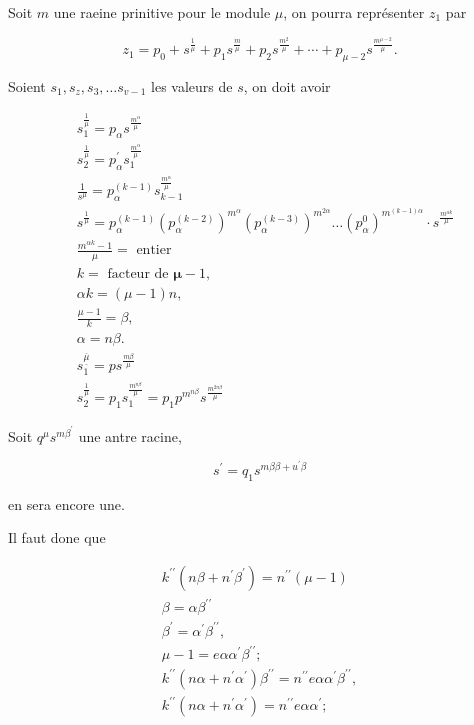 \documentclass{article}
\begin{document}
Soit \(m\) une raeine prinitive pour le module \(\mu\), on pourra représenter \(z_{1}\) par

\[
z_{1}=p_{0}+s^{\frac{1}{\mu}}+p_{1} s^{\frac{m}{\mu}}+p_{2} s^{\frac{m^{2}}{\mu}}+\cdots+p_{\mu-2} s^{\frac{m^{\mu-2}}{\mu}} .
\]

Soient \(s_{1}, s_{z}, s_{3}, \ldots s_{v-1}\) les valeurs de \(s\), on doit avoir

\[
\begin{aligned}
& s_{1}^{\frac{1}{\mu}}=p_{\alpha} s^{\frac{m^{\alpha}}{\mu}} \\
& s_{2}^{\frac{1}{\mu}}=p_{\alpha}^{\prime} s_{1}^{\frac{m^{\alpha}}{\mu}} \\
& \frac{1}{s^{\mu}}=p_{\alpha}^{(k-1)} s_{k-1}^{\frac{m^{\alpha}}{\mu}} \\
& s^{\frac{1}{\mu}}=p_{\alpha}^{(k-1)}\left(p_{\alpha}^{(k-2)}\right)^{m^{\alpha}}\left(p_{\alpha}^{(k-3)}\right)^{m^{2 \alpha}} \ldots\left(p_{\alpha}^{0}\right)^{m^{(k-1) \alpha}} \cdot s^{\frac{m^{\alpha k}}{\mu}} \\
& \frac{m^{\alpha k}-1}{\mu}=\text { entier } \\
& k=\text { facteur de } \boldsymbol{\mu}-1 \text {, } \\
& \alpha k=(\mu-1) n, \\
& \frac{\mu-1}{k}=\beta, \\
& \alpha=n \beta . \\
& s_{1}^{\overline{\underline{\mu}}}=p s^{\frac{m \beta}{\mu}} \\
& s_{2}^{\frac{1}{\mu}}=p_{1} s_{1}^{\frac{m^{n \beta}}{\mu}}=p_{1} p^{m^{n \beta}} s^{\frac{m^{2 n \beta}}{\mu}}
\end{aligned}
\]

Soit \(q^{\mu} s^{m \beta^{\prime}}\) une antre racine,

\[
s^{\prime}=q_{1} s^{m \beta \beta+u^{\prime} \beta}
\]

en sera encore une.

Il faut done que

\[
\begin{gathered}
k^{\prime \prime}\left(n \beta+n^{\prime} \beta^{\prime}\right)=n^{\prime \prime}(\mu-1) \\
\beta=\alpha \beta^{\prime \prime} \\
\beta^{\prime}=\alpha^{\prime} \beta^{\prime \prime}, \\
\mu-1=e \alpha \alpha^{\prime} \beta^{\prime \prime} ; \\
k^{\prime \prime}\left(n \alpha+n^{\prime} \alpha^{\prime}\right) \beta^{\prime \prime}=n^{\prime \prime} e \alpha \alpha^{\prime} \beta^{\prime \prime}, \\
k^{\prime \prime}\left(n \alpha+n^{\prime} \alpha^{\prime}\right)=n^{\prime \prime} e \alpha \alpha^{\prime} ;
\end{gathered}
\]
\end{document}
